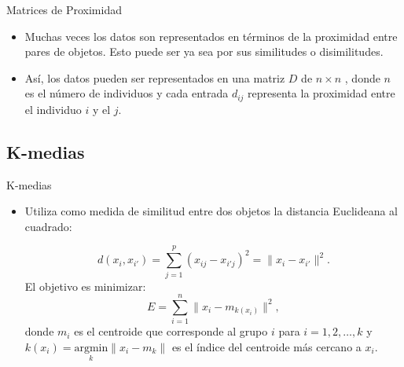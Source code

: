 \documentclass{beamer}
\begin{document}
\begin{frame}{Matrices de Proximidad}
\begin{itemize}
  \item Muchas veces los datos son representados en términos de la proximidad entre pares de objetos. Esto puede ser ya sea por sus similitudes o disimilitudes. 
  \item Así, los datos pueden ser representados en una matriz $D$ de $n \times n$ , donde $n$ es el número de individuos y cada entrada $d_{ij}$ representa la proximidad entre el individuo $i$ y el $j$.

  \end{itemize}
\end{frame}


\subsection{K-medias}
\begin{frame}{K-medias}
  \begin{itemize}
  \item Utiliza como medida de similitud entre dos objetos la distancia Euclideana al cuadrado:

  \begin{equation}
    d(x_{i},x_{i'})= \sum_{j=1}^p (x_{ij}-x_{i'j})^2 = \| x_{i}-x_{i'} \|^2.
  \end{equation}
  El objetivo es minimizar:
  \begin{equation}\label{eq:kmedias}
  E = \sum_{i=1}^{n} \| x_{i} - m_{k(x_{i})} \| ^2,
  \end{equation}
  donde $m_{i}$ es el centroide que corresponde al grupo $i$ para $i=1, 2, \dots, k$  y $k(x_{i})=\underset{k}{\textrm{argmin}} \| x_{i}-m_{k} \| $ es el índice del centroide más cercano a $x_{i}$.
\end{itemize}
\end{frame}

\end{document}
